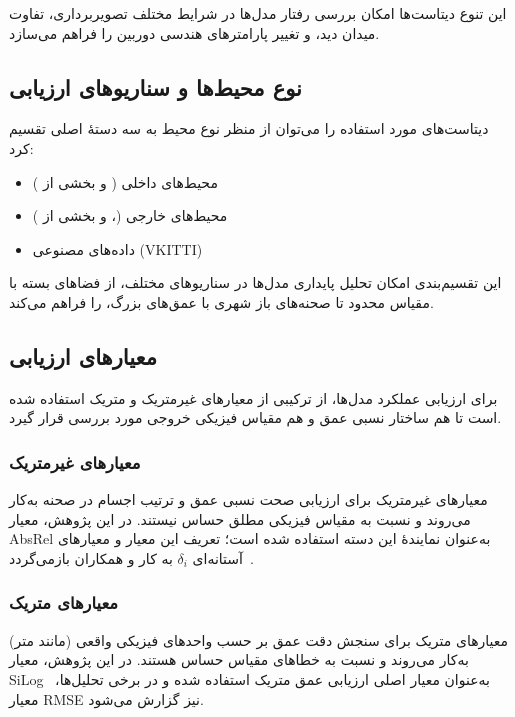 این تنوع دیتاست‌ها امکان بررسی رفتار مدل‌ها
در شرایط مختلف تصویربرداری، تفاوت میدان دید،
و تغییر پارامترهای هندسی دوربین را فراهم می‌سازد.



\subsection{نوع محیط‌ها و سناریوهای ارزیابی}
دیتاست‌های مورد استفاده را می‌توان از منظر نوع محیط
به سه دستهٔ اصلی تقسیم کرد:

\begin{itemize}
    \item محیط‌های داخلی ( و بخشی از )
    \item محیط‌های خارجی (،  و بخشی از )
    \item داده‌های مصنوعی (VKITTI)
\end{itemize}

این تقسیم‌بندی امکان تحلیل پایداری مدل‌ها
در سناریوهای مختلف، از فضاهای بسته با مقیاس محدود
تا صحنه‌های باز شهری با عمق‌های بزرگ،
را فراهم می‌کند.

\subsection{معیارهای ارزیابی}
برای ارزیابی عملکرد مدل‌ها،
از ترکیبی از معیارهای غیرمتریک و متریک استفاده شده است
تا هم ساختار نسبی عمق و هم مقیاس فیزیکی خروجی
مورد بررسی قرار گیرد.

\subsubsection{معیارهای غیرمتریک}
معیارهای غیرمتریک
برای ارزیابی صحت نسبی عمق و ترتیب اجسام در صحنه به‌کار می‌روند
و نسبت به مقیاس فیزیکی مطلق حساس نیستند.
در این پژوهش، معیار AbsRel
به‌عنوان نمایندهٔ این دسته استفاده شده است؛
تعریف این معیار و معیارهای آستانه‌ای $\delta_i$
به کار  و همکاران بازمی‌گردد~\cite{Eigen2014Depth}.

\subsubsection{معیارهای متریک}
معیارهای متریک
برای سنجش دقت عمق بر حسب واحدهای فیزیکی واقعی
(مانند متر) به‌کار می‌روند
و نسبت به خطاهای مقیاس حساس هستند.
در این پژوهش، معیار SiLog~\cite{Eigen2014Depth}
به‌عنوان معیار اصلی ارزیابی عمق متریک استفاده شده
و در برخی تحلیل‌ها، معیار RMSE نیز گزارش می‌شود.

